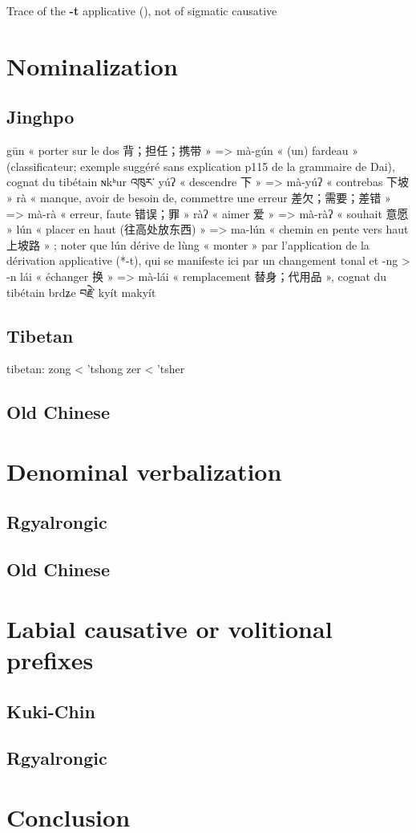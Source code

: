 \documentclass[oneside,a4paper,11pt]{article}
\newcommand{\ipa}[1]{\textbf{{\phon\mbox{#1}}}} %
\begin{document}
Trace of the \ipa{-t} applicative (\citealt{michailovsky85dental, jacques15derivational.khaling}), not of sigmatic causative


\section{Nominalization} \label{sec:voice.nmlz}
\subsection{Jinghpo}

 \citet[4]{dai92yufa}
gūn « porter sur le dos 背；担任；携带 » => mà-gún « (un) fardeau » (classificateur; exemple suggéré sans explication p115 de la grammaire de Dai), cognat du tibétain ɴkʰur འཁུར་
yúʔ « descendre 下 » => mà-yúʔ « contrebas 下坡 »
rà « manque, avoir de besoin de, commettre une erreur 差欠；需要；差错 » => mà-rà « erreur, faute 错误；罪 »
ràʔ « aimer 爱 » => mà-ràʔ « souhait 意愿 »
lún « placer en haut (往高处放东西) » => ma-lún « chemin en pente vers haut 上坡路 » ; noter que lún dérive de lùng « monter » par l’application de la dérivation applicative (*-t), qui se manifeste ici par un changement tonal et -ng > -n
lái « échanger 换 » => mà-lái « remplacement 替身；代用品 », cognat du tibétain brdʑe བརྗེ་
kyít makyít

\subsection{Tibetan}
tibetan:
zong < 'tshong
zer < 'tsher
\subsection{Old Chinese}

\section{Denominal verbalization}  \label{sec:denominal}
\subsection{Rgyalrongic}
\subsection{Old Chinese}
\section{Labial causative or volitional prefixes}
\subsection{Kuki-Chin} \label{sec:pE-kc}
\subsection{Rgyalrongic} \label{sec:YAnmu}

\section*{Conclusion}



\end{document}
